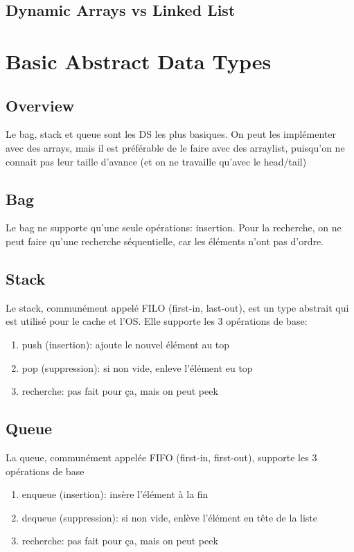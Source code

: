 \documentclass{article}
\begin{document}
\subsection{Dynamic Arrays vs Linked List}

\section{Basic Abstract Data Types}

\subsection{Overview}

Le bag, stack et queue sont les DS les plus basiques. On peut les
implémenter avec des arrays, mais il est préférable de le faire avec des
arraylist, puisqu'on ne connait pas leur taille d'avance (et on ne
travaille qu'avec le head/tail)

\subsection{Bag}

Le bag ne supporte qu'une seule opérations: insertion. Pour la recherche,
on ne peut faire qu'une recherche séquentielle, car les éléments n'ont
pas d'ordre.

\subsection{Stack}

Le stack, communément appelé FILO (first-in, last-out), est un type
abstrait qui est utilisé pour le cache et l'OS. Elle supporte les 3
opérations de base:
\begin{enumerate}
    \item push (insertion): ajoute le nouvel élément au top
    \item pop (suppression): si non vide, enleve l'élément eu top
    \item recherche: pas fait pour ça, mais on peut peek
\end{enumerate}

\subsection{Queue}

La queue, communément appelée FIFO (first-in, first-out), supporte
les 3 opérations de base
\begin{enumerate}
    \item enqueue (insertion): insère l'élément à la fin
    \item dequeue (suppression): si non vide, enlève l'élément en
	tête de la liste
    \item recherche: pas fait pour ça, mais on peut peek
\end{enumerate}
\end{document}
